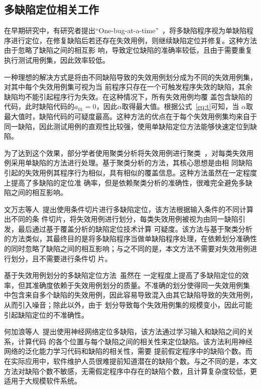 \subsection{多缺陷定位相关工作}
在早期研究中，有研究者提出``One-bug-at-a-time''~\cite{klahr1988cognitive}，将多缺陷程序视为单缺陷程
序进行定位，在修复缺陷后若还存在失效用例，则继续缺陷定位并修复。这种方法由于忽略了缺陷之间的相互影
响，导致定位缺陷的准确率较低，且由于需要重复执行测试用例集，因此效率较低。

一种理想的解决方式是将由不同缺陷导致的失效用例划分成为不同的失效用例集，对其中每个失效用例集可视为当
前程序只存在一个可触发程序失效的缺陷，其余缺陷均不能引起程序行为失效。在这种情况下，所有失效用例均覆
盖包含缺陷的代码，此时缺陷代码的$a_{01}=0$，因此$\alpha$取得最大值。根据公式~\ref{eq:t}可知，当
$\alpha$取最大值时，缺陷代码的可疑度最高。这种方法的优点在于每个失效用例集均来自于同一缺陷，因此测试用例的直观性比较强，使用单缺陷定位方法能够快速定位到缺陷。

为了达到这个效果，部分学者使用聚类分析将失效用例进行聚类~\cite{jones2007debugging,
zheng2006statistical}，对每类失效用例采用单缺陷的方法进行处理。基于聚类分析的方法，其核心思想是由相
同缺陷引起的失效用例其程序行为相似，具有相似的覆盖信息。这种方法虽然在一定程度上提高了多缺陷的定位准
确率，但是依赖聚类分析的准确性，很难完全避免多缺陷之间的相互影响。

文万志等人~\cite{conslice2013}提出使用条件切片进行多缺陷定位，该方法根据输入条件的不同计算出不同的条
件切片，将失效用例进行划分，每类失效用例被视为由同一缺陷引发，最后通过基于覆盖分析的缺陷定位技术计算
可疑度。该方法与基于聚类分析的方法类似，其最终目的是将多缺陷程序当做单缺陷程序处理，在依赖划分准确性
的同时忽略了缺陷之间的相互影响；与之不同的是，本文方法不需要对失效用例进行划分，且不需要进行条件切
片。

基于失效用例划分的多缺陷定位方法~\cite{zheng2006statistical, jones2007debugging, conslice2013}虽然在
一定程度上提高了多缺陷定位的效率，但其准确度依赖于失效用例划分的质量。不准确的划分使得同一失效用例集
中包含来自多个缺陷的失效用例，因此容易导致混入由其它缺陷导致的失效用例，从而引入噪音；除此以外，由于
划分导致每个失效用例集的规模变小，因此可能引起缺陷定位的不准确性。

何加浪等人~\cite{neural2013}提出使用神经网络定位多缺陷，该方法通过学习输入和缺陷之间的关系，计算代码
的各个位置与每个缺陷之间的相关性来定位缺陷。该方法利用神经网络的泛化能力学习代码和缺陷的相关性，需要
提前假定程序中的缺陷个数。而在实际应用中，软件维护人员很难提前知道潜在的缺陷个数。与之不同的是，本文
方法对缺陷个数不敏感，无需假定程序中存在的缺陷个数，且计算复杂度较低，更适用于大规模软件系统。

